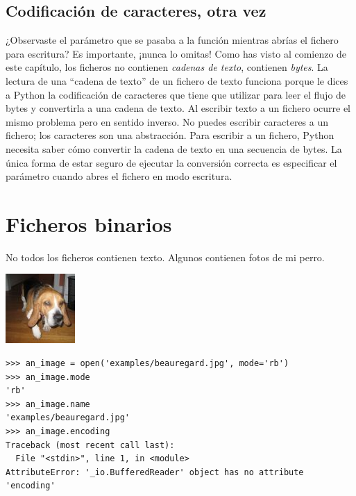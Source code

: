 \subsection{Codificación de caracteres, otra vez}

¿Observaste el parámetro  que se pasaba a la función  mientras abrías el fichero para escritura? Es importante, ¡nunca lo omitas! Como has visto al comienzo de este capítulo, los ficheros no contienen \emph{cadenas de texto}, contienen \emph{bytes}. La lectura de una ``cadena de texto'' de un fichero de texto funciona porque le dices a Python la codificación de caracteres que tiene que utilizar para leer el flujo de bytes y convertirla a una cadena de texto. Al escribir texto a un fichero ocurre el mismo problema pero en sentido inverso. No puedes escribir caracteres a un fichero; los caracteres son una abstracción. Para escribir a un fichero, Python necesita saber cómo convertir la cadena de texto en una secuencia de bytes. La única forma de estar seguro de ejecutar la conversión correcta es especificar el parámetro  cuando abres el fichero en modo escritura.

\section{Ficheros binarios}

No todos los ficheros contienen texto. Algunos contienen fotos de mi perro.

\includegraphics{imagen/beauregard.jpg}

\noindent\begin{minipage}{\textwidth}
\begin{lstlisting}[mathescape=True]
>>> an_image = open('examples/beauregard.jpg', mode='rb')
>>> an_image.mode
'rb'
>>> an_image.name
'examples/beauregard.jpg'
>>> an_image.encoding
Traceback (most recent call last):
  File "<stdin>", line 1, in <module>
AttributeError: '_io.BufferedReader' object has no attribute 'encoding'
\end{lstlisting}
\end{minipage}

